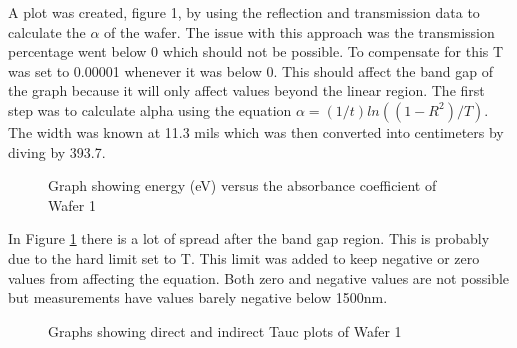 \documentclass[10pt,a4paper]{article}
\begin{document}
\begin{indentPar}{1cm}
A plot was created, figure 1, by using the reflection and transmission data to calculate the $\alpha$ of the wafer. The issue with this approach was the transmission percentage went below 0 which should not be possible. To compensate for this T was set to 0.00001 whenever it was below 0. This should affect the band gap of the graph because it will only affect values beyond the linear region. The first step was to calculate alpha using the equation $ \alpha = (1/t)ln((1-R^2)/T)$. The width was known at 11.3 mils which was then converted into centimeters by diving by 393.7.
\\
\begin{figure}[H]
\label{WOneAbsCo}
\caption{Graph showing energy (eV) versus the absorbance coefficient of Wafer 1}
     \end{figure}
     
     In Figure \ref{WOneAbsCo} there is a lot of spread after the band gap region. This is probably due to the hard limit set to T. This limit was added to keep negative or zero values from affecting the equation. Both zero and negative values are not possible but measurements have values barely negative below 1500nm. 
\begin{figure}[H]
\caption{Graphs showing direct and indirect Tauc plots of Wafer 1}
\end{figure}
\end{indentPar}
\end{document}
